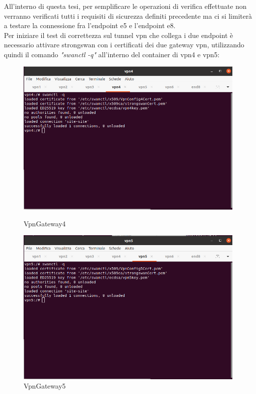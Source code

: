 All'interno di questa tesi, per semplificare le operazioni di verifica effettuate non verranno verificati tutti i requisiti di sicurezza definiti precedente ma ci si limiterà a testare la connessione fra l'endpoint e5 e l'endpoint e8.\\

Per iniziare il test di correttezza sul tunnel vpn che collega i due endpoint è necessario attivare strongswan con i certificati dei due gateway vpn, utilizzando quindi il comando \textit{"swanctl -q"} all'interno del container di vpn4 e vpn5:

\begin{figure}[h]
    \begin{minipage}{0.5\textwidth}
        \centering
        \includegraphics[width=\linewidth]{(01)FirstVPNConfig.png}
        \caption{VpnGateway4}
    \end{minipage}\hfill
    \begin{minipage}{0.5\textwidth}
        \centering
        \includegraphics[width=\linewidth]{(02)SecondVPNConfig.png}
        \caption{VpnGateway5}
    \end{minipage}
\end{figure}

